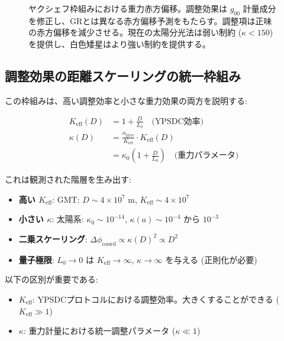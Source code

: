\documentclass[11pt,a4paper]{article}
\begin{document}
\begin{figure}[htbp]
{
		}
		\caption{ヤクシェフ枠組みにおける重力赤方偏移。調整効果は $g_{00}$ 計量成分を修正し、GRとは異なる赤方偏移予測をもたらす。調整項は正味の赤方偏移を減少させる。現在の太陽分光法は弱い制約 ($\kappa < 150$) を提供し、白色矮星はより強い制約を提供する。}
		\label{fig:redshift-detailed}
	\end{figure}
	
	\subsection{調整効果の距離スケーリングの統一枠組み}
	
	この枠組みは、高い調整効率と小さな重力効果の両方を説明する:
	
	\begin{align}
		K_{\mathrm{eff}}(D) &= 1 + \frac{D}{L_0} \quad \text{(YPSDC効率)} \\
		\kappa(D) &= \frac{\alpha_{\text{grav}}}{K_{\text{ref}}} \cdot K_{\mathrm{eff}}(D) \\
		&= \kappa_0 \left(1 + \frac{D}{L_0}\right) \quad \text{(重力パラメータ)}
	\end{align}
	
	これは観測された階層を生み出す:
	\begin{itemize}
		\item \textbf{高い $K_{\mathrm{eff}}$}: GMT: $D \sim 4\times10^7$ m, $K_{\mathrm{eff}} \sim 4\times10^7$
		\item \textbf{小さい $\kappa$}: 太陽系: $\kappa_0 \sim 10^{-14}$, $\kappa(a) \sim 10^{-4}$ から $10^{-3}$
		\item \textbf{二乗スケーリング}: $\Delta\phi_{\text{coord}} \propto \kappa(D)^2 \propto D^2$
		\item \textbf{量子極限}: $L_0 \to 0$ は $K_{\mathrm{eff}} \to \infty$, $\kappa \to \infty$ を与える (正則化が必要)
	\end{itemize}
	
	以下の区別が重要である:
	\begin{itemize}
		\item \textbf{$K_{\mathrm{eff}}$}: YPSDCプロトコルにおける調整効率。大きくすることができる ($K_{\mathrm{eff}} \gg 1$)
		\item \textbf{$\kappa$}: 重力計量における統一調整パラメータ ($\kappa \ll 1$)
	\end{itemize}
	
\end{document}
